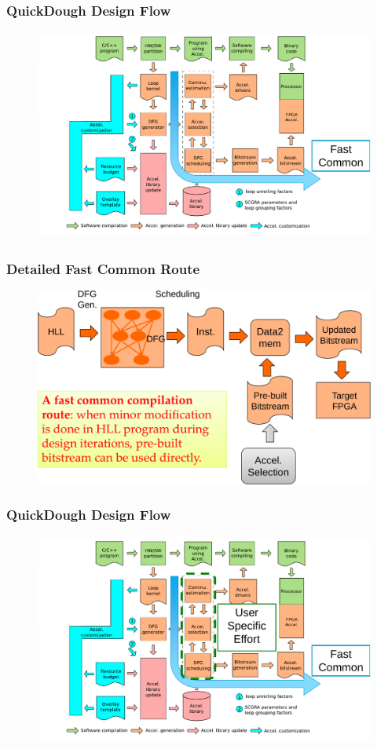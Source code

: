 \documentclass[accentcolor=tud1a,colorbacktitle,inverttitle,landscape,german,presentation,t]{tudbeamer}
\begin{document}
\begin{frame}
  \frametitle{QuickDough Design Flow}
  \begin{figure}
     \includegraphics[width=.95\linewidth]{qd-flow2}
  \end{figure}
  \end{frame}

\begin{frame}
  \frametitle{Detailed Fast Common Route}
  \begin{figure}
     \includegraphics[width=.85\linewidth]{detailed-fast-route}
  \end{figure}
\end{frame}

\begin{frame}
  \frametitle{QuickDough Design Flow}
  \begin{figure}
     \includegraphics[width=.95\linewidth]{qd-flow3}
  \end{figure}
  \end{frame}
\end{document}
